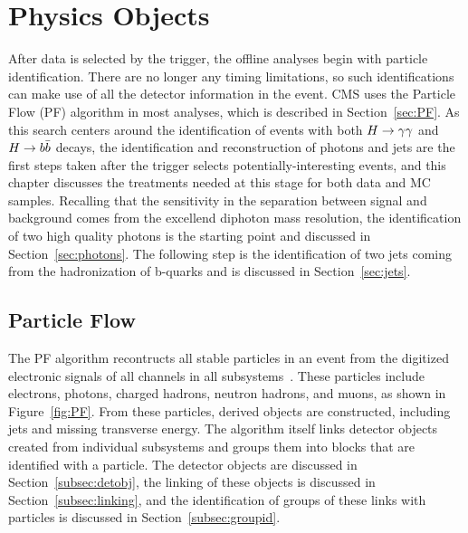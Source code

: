 \chapter{Physics Objects\label{ch:objects}}

After data is selected by the trigger, the offline analyses begin with particle identification.
There are no longer any timing limitations, so such identifications can make use of all the detector
information in the event. CMS uses the Particle Flow (PF) algorithm in most analyses, which is
described in Section~\ref{sec:PF}.
As this search centers around the identification of events with both $H\to\gamma\gamma$ and $H\to b\bar{b}$ decays, the
identification and reconstruction of photons and jets are the first steps taken after the
trigger selects potentially-interesting events,
and this chapter discusses the treatments needed at this stage for both data and MC samples.
Recalling that the sensitivity in the separation between signal and background comes from the
excellend diphoton mass resolution, the identification of two high quality photons is the starting point
and discussed in Section~\ref{sec:photons}. The following step is the identification of two jets
coming from the hadronization of b-quarks and is discussed in Section~\ref{sec:jets}.


\section{Particle Flow\label{sec:PF}}

The PF algorithm recontructs all stable particles in an event from the digitized electronic signals
of all channels in all subsystems~\cite{PFPAS2009,CMS-PAS-PFT-10-001}. These particles include
electrons, photons, charged hadrons, neutron hadrons, and muons, as shown in Figure~\ref{fig:PF}.
From these particles, derived objects are constructed, including jets and missing transverse energy.
The algorithm itself links detector objects created from individual subsystems and groups them into
blocks that are identified with a particle. The detector objects are discussed in
Section~\ref{subsec:detobj}, the linking of these objects is discussed in Section~\ref{subsec:linking},
and the identification of groups of these links with particles is discussed in
Section~\ref{subsec:groupid}.

